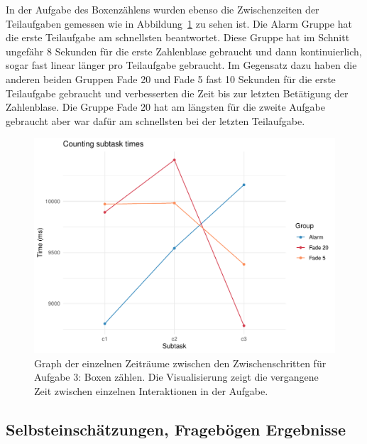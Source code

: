 In der Aufgabe des Boxenzählens wurden ebenso die Zwischenzeiten der Teilaufgaben gemessen wie in Abbildung~\ref{fig:timeTask3} zu sehen ist. Die Alarm Gruppe hat die erste Teilaufgabe am schnellsten beantwortet. Diese Gruppe hat im Schnitt ungefähr  8 Sekunden für die erste Zahlenblase gebraucht und dann kontinuierlich, sogar fast linear länger pro Teilaufgabe gebraucht. Im Gegensatz dazu haben die anderen beiden Gruppen Fade 20 und Fade 5 fast 10 Sekunden für die erste Teilaufgabe gebraucht und verbesserten die Zeit bis zur letzten Betätigung der Zahlenblase. Die Gruppe Fade 20 hat am längsten für die zweite Aufgabe gebraucht aber war dafür am schnellsten bei der letzten Teilaufgabe.

\begin{figure}[H]
	\centering
	\includegraphics[width=\textwidth]{./_StudyResults/timeTask3}
	\caption{Graph der einzelnen Zeiträume zwischen den Zwischenschritten für Aufgabe 3: Boxen zählen. Die Visualisierung zeigt die vergangene Zeit zwischen einzelnen Interaktionen in der Aufgabe.}
	\label{fig:timeTask3}
\end{figure}


\subsection{Selbsteinschätzungen, Fragebögen Ergebnisse}

